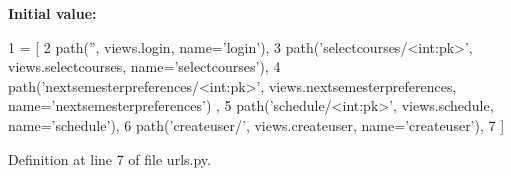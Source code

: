 {\bfseries Initial value\+:}
\begin{DoxyCode}
1 =  [
2     path(\textcolor{stringliteral}{''}, views.login, name=\textcolor{stringliteral}{'login'}),
3     path(\textcolor{stringliteral}{'selectcourses/<int:pk>'}, views.selectcourses, name=\textcolor{stringliteral}{'selectcourses'}),
4     path(\textcolor{stringliteral}{'nextsemesterpreferences/<int:pk>'}, views.nextsemesterpreferences, name=\textcolor{stringliteral}{'nextsemesterpreferences'})
      ,
5     path(\textcolor{stringliteral}{'schedule/<int:pk>'}, views.schedule, name=\textcolor{stringliteral}{'schedule'}),
6     path(\textcolor{stringliteral}{'createuser/'}, views.createuser, name=\textcolor{stringliteral}{'createuser'}),
7 ]
\end{DoxyCode}


Definition at line 7 of file urls.\+py.

